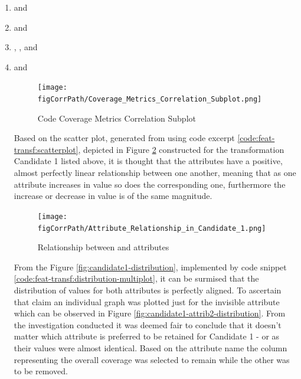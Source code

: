 \begin{enumerate}\label{lst:corr-sub:code-coverage-transf-candidates}
    \item \overallBranchCoverage{} and \branchCoverage{}
    \item \overallUncoveredLines{} and \uncoveredLines{}
    \item \overallCoverage{}, \overallLineCoverage{}, \coverage{} and \lineCoverage{}
    \item \overallUncoveredConditions and \uncoveredConditions{}

\begin{figure}[h!]
    \centering
    \texttt{[image: \\figCorrPath/Coverage\_Metrics\_Correlation\_Subplot.png]}
    \caption{Code Coverage Metrics Correlation Subplot}
    \label{fig:correlation-coverage-metrics-subplot}
\end{figure}
\FloatBarrier

Based on the scatter plot, generated from using code excerpt \ref{code:feat-transf:scatterplot}, depicted in Figure \ref{fig:candidate1-scatterplot} constructed for the transformation Candidate 1 listed above, it is thought that the attributes have a positive, almost perfectly linear relationship between one another, meaning that as one attribute increases in value so does the corresponding one, furthermore the increase or decrease in value is of the same magnitude.
\begin{figure}[h!]
    \centering
    \texttt{[image: \\figCorrPath/Attribute\_Relationship\_in\_Candidate\_1.png]}
    \caption{Relationship between \overallBranchCoverage{} and \branchCoverage{} attributes}
    \label{fig:candidate1-scatterplot}
\end{figure}

From the Figure \ref{fig:candidate1-distribution}, implemented by code snippet \ref{code:feat-transf:distribution-multiplot}, it can be surmised that the distribution of values for both attributes is perfectly aligned. To ascertain that claim an individual graph was plotted just for the invisible attribute \overallBranchCoverage{} which can be observed in Figure \ref{fig:candidate1-attrib2-distribution}.
From the investigation conducted it was deemed fair to conclude that it doesn't matter which attribute is preferred to be retained for Candidate 1 - \overallBranchCoverage{} or \branchCoverage{} as their values were almost identical. Based on the attribute name the column representing the overall coverage was selected to remain while the other was to be removed.


\end{enumerate}
